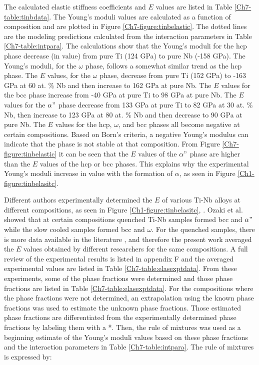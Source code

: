The calculated elastic stiffness coefficients and $E$ values are listed in Table \ref{Ch7-table:tinbdata}. The Young's moduli values are calculated as a function of composition and are plotted in Figure \ref{Ch7-figure:tinbelastic}. The dotted lines are the modeling predictions calculated from the interaction parameters in Table \ref{Ch7-table:intpara}. The calculations show that the Young's moduli for the hcp phase decrease (in value) from pure Ti (124 GPa) to pure Nb (-158 GPa). The Young's moduli, for the $\omega$ phase, follows a somewhat similar trend as the hcp phase. The $E$ values, for the $\omega$ phase, decrease from pure Ti (152 GPa) to -163 GPa at 60 at. \% Nb and then increase to 162 GPa at pure Nb. The $E$ values for the bcc phase increase from -40 GPa at pure Ti to 98 GPa at pure Nb. The $E$ values for the $\alpha"$ phase decrease from 133 GPa at pure Ti to 82 GPa at 30 at. \% Nb, then increase to 123 GPa at 80 at. \% Nb and then decrease to 90 GPa at pure Nb. The $E$ values for the hcp, $\omega$, and bcc phases all become negative at certain compositions. Based on Born's criteria, a negative Young's modulus can indicate that the phase is not stable at that composition. From Figure \ref{Ch7-figure:tinbelastic} it can be seen that the $E$ values of the $\alpha"$ phase are higher than the $E$ values of the hcp or bcc phases. This explains why the experimental Young's moduli increase in value with the formation of $\alpha$, as seen in Figure \ref{Ch1-figure:tinbelasitc}. 

Different authors experimentally determined the $E$ of various Ti-Nb alloys at different compositions, as seen in Figure \ref{Ch1-figure:tinbelasitc}, \cite{Friak2012,Timoshevskii2011,Friak2012,Karre2015}. Ozaki et al. \cite{Ozaki2004} showed that at certain compositions quenched Ti-Nb samples formed bcc and $\alpha"$ while the slow cooled samples formed bcc and $\omega$. For the quenched samples, there is more data available in the literature \cite{Friak2012,Timoshevskii2011,Friak2012,Karre2015}, and therefore the present work averaged the $E$ values obtained by different researchers for the same compositions. A full review of the experimental results is listed in appendix F and the averaged experimental values are listed in Table \ref{Ch7-table:elasexptdata}. From these experiments, some of the phase fractions were determined \cite{Friak2012} and those phase fractions are listed in Table \ref{Ch7-table:elasexptdata}. For the compositions where the phase fractions were not determined, an extrapolation using the known phase fractions was used to estimate the unknown phase fractions. Those estimated phase fractions are differentiated from the experimentally determined phase fractions by labeling them with a *. Then, the rule of mixtures was used as a beginning estimate of the Young's moduli values based on these phase fractions and the interaction parameters in Table \ref{Ch7-table:intpara}. The rule of mixtures is expressed by:

